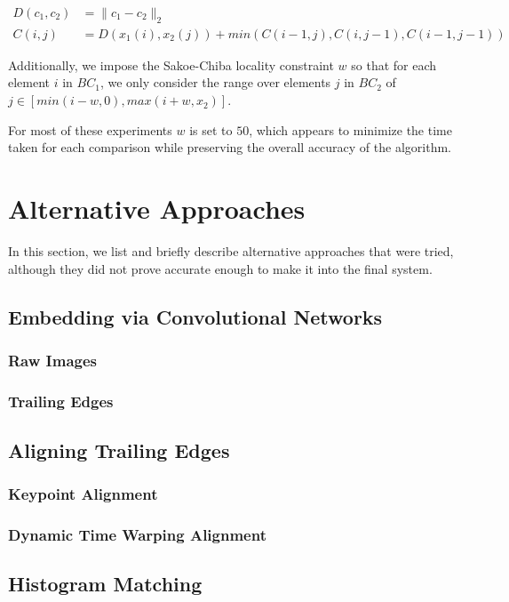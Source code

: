 \begin{align}
D(c_1, c_2) &= \lVert c_1 - c_2 \rVert_2\\
C(i,j) &= D(x_1(i),x_2(j)) + min(C(i-1,j), C(i,j-1), C(i-1, j-1))
\end{align}

Additionally, we impose the Sakoe-Chiba \cite{sakoe1978dynamic} locality constraint $w$ so that for each element $i$ in $BC_1$, we only consider the range over elements $j$ in $BC_2$ of $j \in [min(i - w, 0), max(i + w, x_2)]$.

For most of these experiments $w$ is set to $50$, which appears to minimize the time taken for each comparison while preserving the overall accuracy of the algorithm.

\section{Alternative Approaches}

In this section, we list and briefly describe alternative approaches that were tried, although they did not prove accurate enough to make it into the final system.

\subsection{Embedding via Convolutional Networks}

\subsubsection{Raw Images}

\subsubsection{Trailing Edges}

\subsection{Aligning Trailing Edges}

\subsubsection{Keypoint Alignment}

\subsubsection{Dynamic Time Warping Alignment}

\subsection{Histogram Matching}


